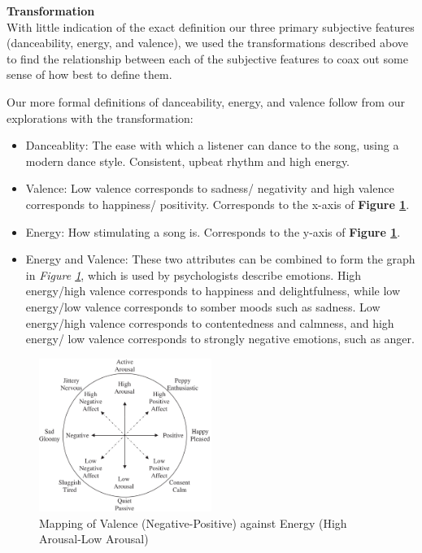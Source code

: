 \documentclass{article}
\begin{document}
\textbf{Transformation}\\
With little indication of the exact definition our three primary subjective features
(danceability, energy, and valence), we used the transformations described above
to find the relationship between each of the subjective features to coax out
some sense of how best to define them.

Our more formal definitions of danceability, energy, and valence follow from our
explorations with the transformation:
\begin{itemize}
\item Danceablity: The ease with which a listener can dance to the song, using a
modern dance style. Consistent, upbeat rhythm and high energy.

\item Valence: Low valence corresponds to sadness/ negativity and high valence
corresponds to happiness/ positivity. Corresponds to the x-axis of \textbf{Figure
\ref{energy-valence}}.

\item Energy: How stimulating a song is. Corresponds to the y-axis of \textbf{Figure
\ref{energy-valence}}.

\item Energy and Valence: These two attributes can be combined to form the graph
in \textit{Figure \ref{energy-valence}}, which is used by psychologists describe
emotions. High energy/high valence corresponds to happiness and delightfulness,
while low energy/low valence corresponds to somber moods such as sadness. Low
energy/high valence corresponds to contentedness and calmness, and high energy/
low valence corresponds to strongly negative emotions, such as anger.

\end{itemize}
\begin{figure}[H]
\includegraphics[width=0.5\textwidth]{../images/valence.png}
\caption{
  Mapping of Valence (Negative-Positive) against Energy (High Arousal-Low Arousal)
}
\label{energy-valence}
\end{figure}
\end{document}
